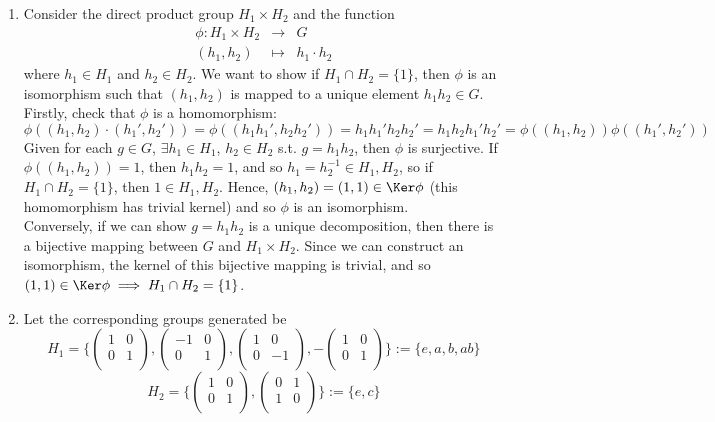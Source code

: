 \documentclass[a4paper]{article}
\begin{document}
\begin{ans}\leavevmode
\begin{enumerate}[label=(\alph*)]
\item Consider the direct product group $H_1\times H_2$ and the function
\begin{eqnarray}
\phi: H_1\times H_2&\rightarrow&G\nonumber\\(h_1,h_2)&\mapsto& h_1\cdot h_2\nonumber
\end{eqnarray}
where $h_1\in H_1$ and $h_2\in H_2$. We want to show if $H_1\cap H_2=\{1\}$, then $\phi$ is an isomorphism such that $(h_1,h_2)$ is mapped to a unique element $h_1h_2\in G$. Firstly, check that $\phi$ is a homomorphism:
$$\phi((h_1,h_2)\cdot(h_1',h_2'))=\phi((h_1h_1',h_2h_2'))=h_1h_1'h_2h_2'=h_1h_2h_1'h_2'=\phi((h_1,h_2))\phi((h_1',h_2'))$$
Given for each $g\in G$, $\exists h_1\in H_1$, $h_2\in H_2$ s.t. $g=h_1h_2$, then $\phi$ is surjective. If $\phi((h_1,h_2))=1$, then $h_1h_2=1$, and so $h_1=h_2^{-1}\in H_1,H_2$, so if $H_1\cap H_2=\{1\}$, then $1\in H_1,H_2$. Hence, $(h_1,h_2)=(1,1)\in\Ker\phi$ (this homomorphism has trivial kernel) and so $\phi$ is an isomorphism.\\[5pt]
Conversely, if we can show $g=h_1h_2$ is a unique decomposition, then there is a bijective mapping between $G$ and $H_1\times H_2$. Since we can construct an isomorphism, the kernel of this bijective mapping is trivial, and so $(1,1)\in\Ker\phi\implies H_1\cap H_2=\{1\}$.
\item Let the corresponding groups generated be
$$H_1=\bigg\{\begin{pmatrix}1&0\\0&1\\\end{pmatrix},\begin{pmatrix}-1&0\\0&1\\\end{pmatrix},\begin{pmatrix}1&0\\0&-1\\\end{pmatrix},-\begin{pmatrix}1&0\\0&1\\\end{pmatrix}\bigg\}:=\{e,a,b,ab\}$$
$$H_2=\bigg\{\begin{pmatrix}1&0\\0&1\\\end{pmatrix},\begin{pmatrix}0&1\\1&0\\\end{pmatrix}\bigg\}:=\{e,c\}$$

\end{enumerate}
\end{ans}
\end{document}
